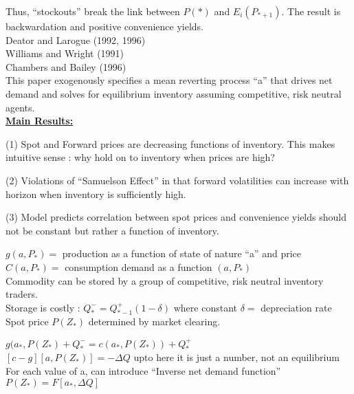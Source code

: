 Thus, ``stockouts'' break the link between $P(*)$ and $E_i (P_{*+1})$. The result is backwardation and positive convenience yields.\\

Deator and Larogue (1992, 1996)\\
Williams and Wright (1991)\\
Chambers and Bailey (1996)\\

This paper exogenously specifies a mean reverting process ``a'' that drives net demand and solves for equilibrium inventory assuming competitive, risk neutral agents.\\

\textbf{\underline{Main Results:}}
\begin{list}{ }{}
\item (1) Spot and Forward prices are decreasing functions of inventory. This makes intuitive sense : why hold on to inventory when prices are high?
\item (2) Violations of ``Samuelson Effect'' in that forward volatilities can increase with horizon when inventory is sufficiently high.
\item (3) Model predicts correlation between spot prices and convenience yields should not be constant but rather a function of inventory.
\end{list}

$g(a,P_*) = $ production as a function of state of nature ``a'' and price\\

$C(a,P_*) = $ consumption demand as a function $(a, P_*)$\\

Commodity can be stored by a group of competitive, risk neutral inventory traders.\\

Storage is costly : $Q_* ^- = Q_{*-1} ^ + (1-\delta)$ where constant $\delta = $ depreciation rate\\

Spot price $P(Z_*)$ determined by market clearing.


$g(a_*, P(Z_*) + Q_* ^{-} = c(a_*, P(Z_*)) + Q_* ^{+}$\\
$[c-g] [a, P(Z_*)] = - \Delta Q $ upto here it is just a number, not an equilibrium\\

For each value of a, can introduce ``Inverse net demand function''\\
$P(Z_*) = F[a_*, \Delta Q]$\\

